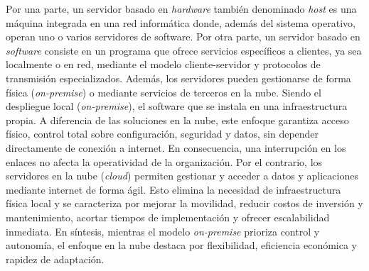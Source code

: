 Por una parte, 
un servidor basado en \textit{hardware} también denominado \textit{host} es 
una máquina integrada en una red informática donde, además del sistema operativo, operan uno o 
varios servidores de software. Por otra parte, un servidor basado en \textit{software} consiste 
en un programa que ofrece servicios específicos a clientes, ya sea localmente o en red, mediante el 
modelo cliente-servidor y protocolos de transmisión especializados.
\newline
Además, los servidores pueden gestionarse de forma física (\textit{on-premise}) 
o mediante servicios de terceros en la nube. 
Siendo el despliegue local (\textit{on-premise}), 
el software que se instala en una infraestructura propia. 
\newline
A diferencia de las soluciones en la nube, 
este enfoque garantiza acceso físico, control total sobre configuración, seguridad y datos,
sin depender directamente de conexión a internet. En consecuencia, una interrupción 
en los enlaces no afecta la operatividad de la organización.
\newline
Por el contrario, los servidores en la nube (\textit{cloud}) permiten gestionar 
y acceder a datos y aplicaciones mediante internet de forma ágil. Esto elimina la necesidad de infraestructura física local 
y se caracteriza por mejorar la movilidad, reducir costos de inversión y mantenimiento, 
acortar tiempos de implementación y ofrecer escalabilidad inmediata.
\newline
En síntesis, mientras el modelo \textit{on-premise} prioriza control y autonomía, 
el enfoque en la nube destaca por flexibilidad, eficiencia económica y rapidez de adaptación.
